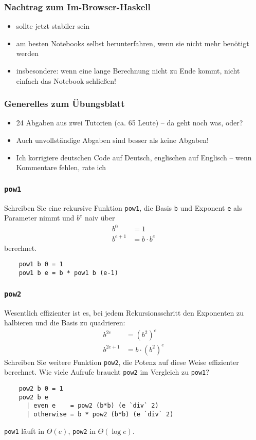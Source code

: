 \documentclass{beamer}
\date{2016-10-28/31}
\begin{document}
\normalsize
\normalem

\begin{frame}[plain]
  \titlepage
\end{frame}

\begin{frame}
  \frametitle{Nachtrag zum Im-Browser-Haskell}
  \begin{itemize}
  \item sollte jetzt stabiler sein
  \item am besten Notebooks selbst herunterfahren, wenn sie nicht mehr benötigt werden
  \item insbesondere: wenn eine lange Berechnung nicht zu Ende kommt, nicht einfach das Notebook schließen!
  \end{itemize}
\end{frame}

\begin{frame}
  \frametitle{Generelles zum Übungsblatt}
  \begin{itemize}
  \item 24 Abgaben aus zwei Tutorien (ca. 65 Leute) – da geht noch was, oder?
  \item Auch unvollständige Abgaben sind besser als keine Abgaben!
  \item Ich korrigiere deutschen Code auf Deutsch, englischen auf Englisch – wenn Kommentare fehlen, rate ich
  \end{itemize}
\end{frame}

\begin{frame}[fragile]
  \frametitle{\lstinline{pow1}}
  Schreiben Sie eine rekursive Funktion \lstinline{pow1}, die Basis \lstinline{b} und Exponent \lstinline{e} als Parameter nimmt und $b^e$ naiv über
  \begin{align*}
    b^0 &= 1\\
    b^{e+1} &= b \cdot b^e
  \end{align*}
  berechnet.
  \pause
  \begin{lstlisting}
    pow1 b 0 = 1
    pow1 b e = b * pow1 b (e-1)
  \end{lstlisting}
\end{frame}

\begin{frame}[fragile]
  \frametitle{\lstinline{pow2}}
  Wesentlich effizienter ist es, bei jedem Rekursionsschritt den Exponenten zu halbieren und die Basis zu quadrieren:
  \begin{align*}
    b^{2e} &= (b^2)^e \\
    b^{2e+1} &= b \cdot (b^2)^e
  \end{align*}
  Schreiben Sie weitere Funktion \lstinline{pow2}, die Potenz auf diese Weise effizienter berechnet.
  Wie viele Aufrufe braucht \lstinline{pow2} im Vergleich zu \lstinline{pow1}?
  \pause
  \begin{lstlisting}
    pow2 b 0 = 1
    pow2 b e
      | even e    = pow2 (b*b) (e `div` 2)
      | otherwise = b * pow2 (b*b) (e `div` 2)
  \end{lstlisting}
  
  \pause
  \lstinline{pow1} läuft in $\Theta(e)$, \lstinline{pow2} in $\Theta(\log e)$.
\end{frame}
\end{document}
